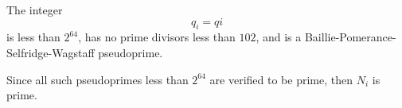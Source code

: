 \pagestyle{empty}
\phantom{a}
\vspace{2em}

\begin{center}
{\Huge {}}
\end{center}
\vspace{2em}

\noindent The integer
{\Huge
$$
q_{ {{ i }} } = {{ qi }}
$$
}
is less than $2^{64}$, has no prime divisors less than $102$, and is a Baillie-Pomerance-Selfridge-Wagstaff pseudoprime.

\vspace{2em}
\noindent Since all such pseudoprimes less than $2^{64}$ are verified to be prime, then $N_i$ is prime.